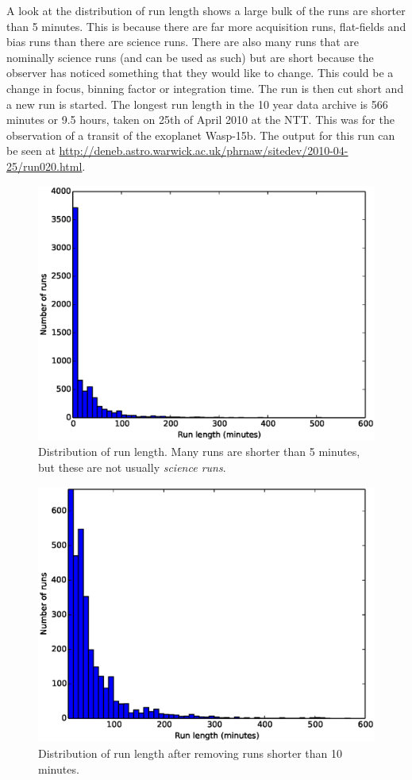 A look at the distribution of run length shows a large bulk of the runs are shorter than 5 minutes. This is because there are far more acquisition runs, flat-fields and bias runs than there are science runs. There are also many runs that are nominally science runs (and can be used as such) but are short because the observer has noticed something that they would like to change. This could be a change in focus, binning factor or integration time. The run is then cut short and a new run is started. The longest run length in the 10 year data archive is 566 minutes or 9.5 hours, taken on 25th of April 2010 at the NTT. This was for the observation of a transit of the exoplanet Wasp-15b. The output for this run can be seen at \small \url{http://deneb.astro.warwick.ac.uk/phrnaw/sitedev/2010-04-25/run020.html}. 

\begin{figure}[!h]
  \centering
  \includegraphics[width=120mm]{images/hist0-600.eps}
  \caption{Distribution of run length. Many runs are shorter than 5 minutes, but these are not usually \emph{science runs}.}
  \label{fig:histogram0-600}
\end{figure}

\begin{figure}[!h]
  \centering
  \includegraphics[width=120mm]{images/hist10-600.eps}
  \caption{Distribution of run length after removing runs shorter than 10 minutes.}
  \label{fig:histogram10-600}
\end{figure}

